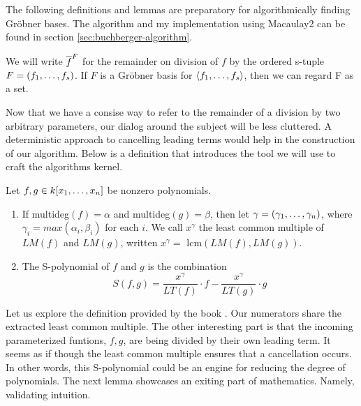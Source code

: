 The following definitions and lemmas are preparatory for algorithmically finding Gröbner bases. The algorithm and my implementation using Macaulay2 can be found in section \ref{sec:buchberger-algorithm}.

\begin{definition}
    \label{def:spolynomial}
    We will write $\overline{f}^{F}$ for the remainder on division of $f$ by the ordered s-tuple $F = (f_1, \dots, f_s)$. If $F$ is a Gröbner basis for $\langle f_1, \dots, f_s \rangle$, then we can regard F as a set. 
\end{definition}

Now that we have a consise way to refer to the remainder of a division by two arbitrary parameters, our dialog around the subject will be less cluttered. A deterministic approach to cancelling leading terms would help in the construction of our algorithm. Below is a definition that introduces the tool we will use to craft the algorithms kernel. 

\begin{definition}
    Let $f,g \in k\lbrack x_1, \dots, x_n \rbrack$ be nonzero polynomials.
    
    \begin{enumerate}
        \item If multideg$(f) = \alpha$ and multideg$(g) = \beta$, then let $\gamma = (\gamma_1, \dots, \gamma_n)$, where $\gamma_i = max(\alpha_i, \beta_i)$ for each $i$. We call $x^\gamma$ the least common multiple of $LM(f)$ and $LM(g)$, written $x^\gamma = $ lcm$(LM(f), LM(g))$.
        
        \item The S-polynomial of $f$ and $g$ is the combination 
        \begin{equation}
            S(f,g) = \frac{x^\gamma}{LT(f)} \cdot f -\frac{x^\gamma}{LT(g)} \cdot g 
        \end{equation}
    \end{enumerate}
\end{definition}

Let us explore the definition provided by the book \cite{Theory}. Our numerators share the extracted least common multiple. The other interesting part is that the incoming parameterized funtions, $f,g$, are being divided by their own leading term. It seems as if though the least common multiple ensures that a cancellation occurs. In other words, this S-polynomial could be an engine for reducing the degree of polynomials. The next lemma showcases an exiting part of mathematics. Namely, validating intuition.

